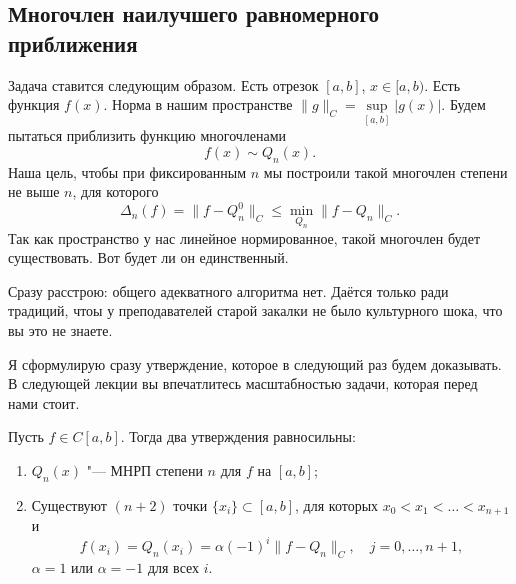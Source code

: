 \subsection{Многочлен наилучшего равномерного приближения}
Задача ставится следующим образом. Есть отрезок $[a,b]$, $x\in[a,b)$. Есть функция $f(x)$. Норма в нашим пространстве $\|g\|_C = \sup\limits_{[a,b]}\big|g(x)\big|$. Будем пытаться приблизить функцию многочленами
\[
  f(x)\sim Q_n(x).
\]
Наша цель, чтобы при фиксированным $n$ мы построили такой многочлен степени не выше $n$, для которого
\[
  \Delta_n(f) = \|f- Q_n^0\|_C\le \min\limits_{Q_n}\|f-Q_n\|_C.
\]
Так как пространство у нас линейное нормированное, такой многочлен будет существовать. Вот будет ли он единственный.

Сразу расстрою: общего адекватного алгоритма нет. Даётся только ради традиций, чтоы у преподавателей старой закалки не было культурного шока, что вы это не знаете.

Я сформулирую сразу утверждение, которое в следующий раз будем доказывать. В следующей лекции вы впечатлитесь масштабностью задачи, которая перед нами стоит.

\begin{The}[Чебышёва]
  Пусть $f\in C[a,b]$. Тогда два утверждения равносильны: 
  \begin{enumerate}
  \item $Q_n(x)$ "--- МНРП степени $n$ для $f$ на $[a,b]$;
  \item Существуют $(n+2)$ точки $\{x_i\}\subset [a,b]$, для которых $x_0<x_1<\dots<x_{n+1}$ и
  \[
    f(x_i) = Q_n(x_i) = \alpha(-1)^i\| f - Q_n\|_C,\quad
    j=0,\dots,n+1,
  \]
  $\alpha = 1$ или $\alpha=-1$ для всех $i$.
  \end{enumerate}
\end{The}